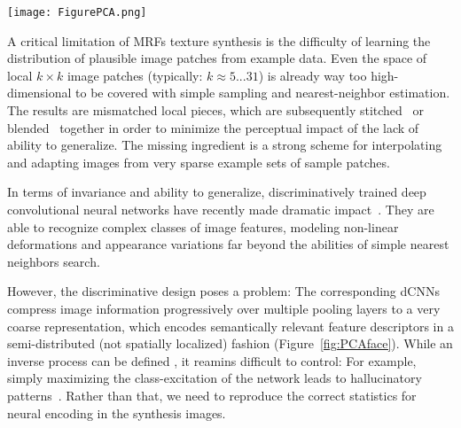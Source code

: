 \documentclass[10pt,twocolumn,letterpaper]{article}
\begin{document}
\begin{figure*}[t]
	\centering
		\texttt{[image: FigurePCA.png]}
		\caption{The input image is encoded by the VGG network (pixel colors show a 3D PCA embedding of the high-dimensiontal feature space). Related image content is mapped to semi-distributed, approximately spatially coherent feature constellations of increasing invariance \protect\cite{Zeiler14}. Input image credited to flickr user \emph{Emery Way}.}
	\label{fig:PCAface}
\end{figure*}

A critical limitation of MRFs texture synthesis is the difficulty of learning the distribution of plausible image patches from example data. Even the space of local $k \times k$ image patches (typically: $k \approx 5...31$) is already way too high-dimensional to be covered with simple sampling and nearest-neighbor estimation. The results are mismatched local pieces, which are subsequently stitched~\cite{Kwatra03} or blended~\cite{Kwatra05} together in order to minimize the perceptual impact of the lack of ability to generalize. The missing ingredient is a strong scheme for interpolating and adapting images from very sparse example sets of sample patches. 

In terms of invariance and ability to generalize, discriminatively trained deep convolutional neural networks have recently made dramatic impact~\cite{Krizhevsky2012,Simonyan14c}. They are able to recognize complex classes of image features, modeling non-linear deformations and appearance variations far beyond the abilities of simple nearest neighbors search.

However, the discriminative design poses a problem: The corresponding dCNNs compress image information progressively over multiple pooling layers to a very coarse representation, which encodes semantically relevant feature descriptors in a semi-distributed (not spatially localized) fashion (Figure~\ref{fig:PCAface}). While an inverse process can be defined \cite{Denton15,Dong15,Gatys15,Gatys2015b,Gauthier15,Mahendran15,Xu15,Zeiler14}, it reamins difficult to control: For example, simply maximizing the class-excitation of the network leads to hallucinatory patterns~\cite{Mordvintsev15}. Rather than that, we need to reproduce the correct statistics for neural encoding in the synthesis images. 
\end{document}
